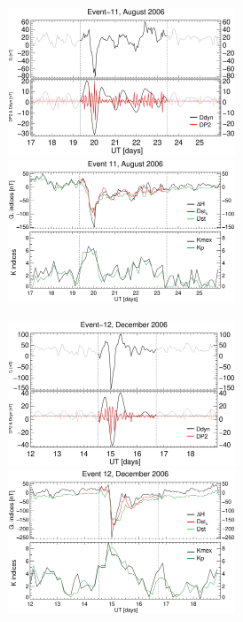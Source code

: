 \documentclass[a4paper,fleqn]{cas-dc}
\begin{document}
\begin{figure}[h!]
    \centering
    \centerline{\Large \bf   
         \hfill}
          \centerline{\Large \bf   
      \hspace{0.26\textwidth}  \color{black}{}
       \hspace{0.31\textwidth}  \color{black}{}
         \hfill}
     \centerline{\Large \bf   
      \hspace{0.275\textwidth}  \color{black}{}
       \hspace{0.295\textwidth}  \color{black}{}
         \hfill}
	 \includegraphics[width=6.0cm]{images/diono/iono_PI_V1_2006-08-17.eps}
     \includegraphics[width=6.0cm]{images/dH_approx/diono_valid_V4_2006-08-17.eps}	
     \centerline{\Large \bf   
      \hspace{0.275\textwidth}  \color{black}{}
       \hspace{0.295\textwidth}  \color{black}{}
         \hfill}
     \includegraphics[width=6.0cm]{images/diono/iono_PI_V1_2006-12-12.eps}
     \includegraphics[width=6.0cm]{images/dH_approx/diono_valid_V4_2006-12-12.eps}     

\end{figure}
\end{document}
